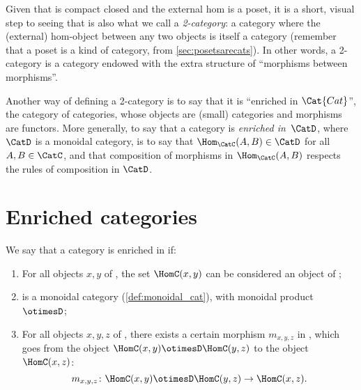 Given that \DP is compact closed and the external hom is a poset, it is a short, visual step to seeing that \DP is also what we call a \emph{2-category}: a category where the (external) hom-object between any two objects is itself a category (remember that a poset is a kind of category, from \cref{sec:posetsarecats}). In other words, a 2-category is a category endowed with the extra structure of ``morphisms between morphisms''.

Another way of defining a 2-category is to say that it is ``enriched in $\Cat{Cat}$'', the category of categories, whose objects are (small) categories and morphisms are functors. More generally, to say that a category \CatC is \emph{enriched in~$\CatD$}, where $\CatD$ is a monoidal category, is to say that $\Hom_\CatC(A,B) \in \CatD$ for all $A,B \in \CatC$, and that composition of morphisms in $\Hom_\CatC(A,B)$ respects the rules of composition in $\CatD$.

\section{Enriched categories}

\begin{ctdefinition}
We say that a category \CatC is enriched in \CatD if:
\begin{enumerate}
\item For all objects $x, y$ of \CatC, the set $\HomC(x,y)$ can be considered an object of \CatD;
\item \CatD is a monoidal category (\cref{def:monoidal_cat}),
with monoidal product~$\otimesD$;
\item For all objects $x, y, z$ of \CatC, there exists
a certain morphism $m_{x,y,z}$ in \CatD,
which goes from the object $\HomC(x, y) \otimesD \HomC(y, z)$ to the object $\HomC(x, z)$:
\begin{equation}
\label{eq:enriched-condition}
m_{x,y,z} \colon \HomC(x, y) \otimesD \HomC(y, z) \to \HomC(x, z).
\end{equation}
\end{enumerate}
\end{ctdefinition}

%

